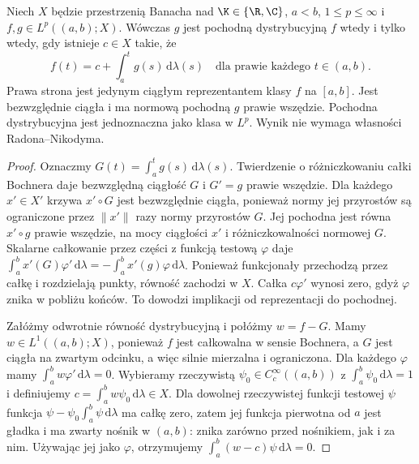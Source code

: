 \begin{twierdzenie}
\label{thm:bochner-sobolev15b}
Niech $X$ będzie przestrzenią Banacha nad $\K\in\{\R,\C\}$,
$a<b$, $1\le p\le\infty$ i $f,g\in L^p((a,b);X)$.
Wówczas $g$ jest pochodną dystrybucyjną $f$ wtedy
i tylko wtedy, gdy istnieje $c\in X$ takie, że
\[
 f(t)=c+\int_a^t g(s)\,\mathrm d\lambda(s)
 \quad\text{dla prawie każdego }t\in(a,b).
\]
Prawa strona jest jedynym ciągłym reprezentantem
klasy $f$ na $[a,b]$. Jest bezwzględnie ciągła
i ma normową pochodną $g$ prawie wszędzie.
Pochodna dystrybucyjna jest jednoznaczna jako klasa
w $L^p$. Wynik nie wymaga własności Radona--Nikodyma.
\end{twierdzenie}
\begin{proof}
Oznaczmy $G(t)=\int_a^t g(s)\,\mathrm d\lambda(s)$.
Twierdzenie o różniczkowaniu całki Bochnera daje
bezwzględną ciągłość $G$ i $G'=g$ prawie wszędzie.
Dla każdego $x'\in X'$ krzywa $x'\circ G$ jest
bezwzględnie ciągła, ponieważ normy jej przyrostów
są ograniczone przez $\|x'\|$ razy normy przyrostów
$G$. Jej pochodna jest równa $x'\circ g$ prawie
wszędzie, na mocy ciągłości $x'$ i różniczkowalności
normowej $G$. Skalarne całkowanie przez części
z funkcją testową $\varphi$ daje
$\int_a^b x'(G)\varphi'\,\mathrm d\lambda
=-\int_a^b x'(g)\varphi\,\mathrm d\lambda$.
Ponieważ funkcjonały przechodzą przez całkę i rozdzielają
punkty, równość zachodzi w $X$. Całka $c\varphi'$
wynosi zero, gdyż $\varphi$ znika w pobliżu końców.
To dowodzi implikacji od reprezentacji do pochodnej.

Załóżmy odwrotnie równość dystrybucyjną i połóżmy
$w=f-G$. Mamy $w\in L^1((a,b);X)$, ponieważ $f$
jest całkowalna w sensie Bochnera, a $G$ jest
ciągła na zwartym odcinku, a więc silnie mierzalna
i ograniczona. Dla każdego $\varphi$ mamy
$\int_a^b w\varphi'\,\mathrm d\lambda=0$.
Wybieramy rzeczywistą $\psi_0\in C_c^\infty((a,b))$
z $\int_a^b\psi_0\,\mathrm d\lambda=1$ i definiujemy
$c=\int_a^b w\psi_0\,\mathrm d\lambda\in X$.
Dla dowolnej rzeczywistej funkcji testowej $\psi$
funkcja $\psi-\psi_0\int_a^b\psi\,\mathrm d\lambda$
ma całkę zero, zatem jej funkcja pierwotna od $a$
jest gładka i ma zwarty nośnik w $(a,b)$:
znika zarówno przed nośnikiem, jak i za nim.
Używając jej jako $\varphi$, otrzymujemy
$\int_a^b(w-c)\psi\,\mathrm d\lambda=0$.


\end{proof}

